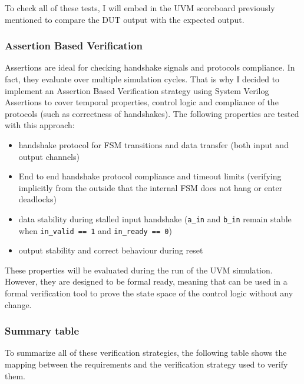 \vspace{5mm}

To check all of these tests, I will embed in the UVM scoreboard previously mentioned to compare the DUT output with the expected output.

\subsubsection{Assertion Based Verification}
Assertions are ideal for checking handshake signals and protocols compliance. In fact, they evaluate over multiple simulation cycles. That is why I decided to implement an Assertion Based Verification strategy using System Verilog Assertions to cover temporal properties, control logic and compliance of the protocols (such as correctness of handshakes). The following properties are tested with this approach:
\begin{itemize}
    \item handshake protocol for FSM transitions and data transfer (both input and output channels)
    \item End to end handshake protocol compliance and timeout limits (verifying implicitly from the outside that the internal FSM does not hang or enter deadlocks)
    \item data stability during stalled input handshake (\texttt{a\_in} and \texttt{b\_in} remain stable when \texttt{in\_valid == 1} and \texttt{in\_ready == 0})
    \item output stability and correct behaviour during reset
\end{itemize}

These properties will be evaluated during the run of the UVM simulation. However, they are designed to be formal ready, meaning that can be used in a formal verification tool to prove the state space of the control logic without any change.

\subsubsection{Summary table}
To summarize all of these verification strategies, the following table shows the mapping between the requirements and the verification strategy used to verify them.


